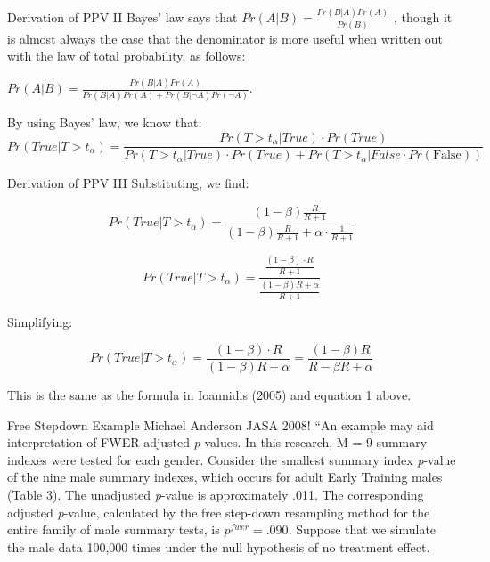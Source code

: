 \documentclass{beamer}
\begin{document}
\begin{frame}[label=derive]{Derivation of PPV II}
Bayes' law says that \(Pr(A|B) = \frac{Pr(B|A)Pr(A)}{Pr(B)}\) , though
it is almost always the case that the denominator is more useful when
written out with the law of total probability, as follows:

\(Pr(A|B) = \frac{Pr(B|A)Pr(A)}{Pr(B|A)Pr(A) + Pr(B|\neg A)Pr(\neg A)}\).

By using Bayes' law, we know that:
\tiny{
\[Pr(True|T > t_{\alpha}) = \frac{Pr(T > t_{\alpha}|True) \cdot Pr(True)}{Pr(T > t_{\alpha}|True) \cdot Pr(True) + Pr(T > t_{\alpha}|False \cdot Pr\left( \text{False} \right))}\]}
\end{frame}

\begin{frame}[label=derive]{Derivation of PPV III}
Substituting, we find:

\[Pr(True|T > t_{\alpha}) = \frac{(1 - \beta)\frac{R}{R + 1}}{(1 - \beta)\frac{R}{R + 1} + \alpha \cdot \frac{1}{R + 1}}\]

\[Pr(True|T > t_{\alpha}) = \frac{\frac{(1 - \beta) \cdot R}{R + 1}}{\frac{(1 - \beta)R + \alpha}{R + 1}}\]

Simplifying:

\[Pr(True|T > t_{\alpha}) = \frac{(1 - \beta) \cdot R}{(1 - \beta)R + \alpha} = \frac{(1 - \beta)R}{R - \beta R + \alpha}\]

This is the same as the formula in Ioannidis (2005) and equation 1
above.
\hyperlink{Ioannidis}{}
\end{frame}

\begin{frame}[label=FWERex]{Free Stepdown Example}
Michael Anderson JASA 2008! \href{https://are.berkeley.edu/~mlanderson/pdf/Anderson\%202008a.pdf}{}
\vskip0.2in
``An example may aid interpretation of FWER-adjusted \textit{p}-values.
In this research, M = 9 summary indexes were tested for
each gender. Consider the smallest summary index \textit{p}-value of
the nine male summary indexes, which occurs for adult Early
Training males (Table 3). The unadjusted \textit{p}-value is approximately
.011. The corresponding adjusted \textit{p}-value, calculated
by the free step-down resampling method for the entire family
of male summary tests, is $p^{fwer} = .090$. Suppose that we simulate
the male data 100,000 times under the null hypothesis of no
treatment effect. 
\end{frame}
\end{document}
